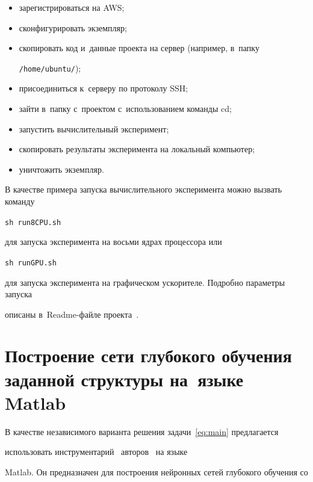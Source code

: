 \begin{itemize}


\item зарегистрироваться на AWS;


\item сконфигурировать экземпляр;


\item скопировать код и~данные проекта на сервер (например, в~папку 


\texttt{/home/ubuntu/});


\item присоединиться к~серверу по протоколу SSH;


\item зайти в~папку с~проектом с~использованием команды cd;


\item запустить вычислительный эксперимент;


\item скопировать результаты эксперимента на локальный компьютер;


\item уничтожить экземпляр.


\end{itemize}


В качестве примера запуска вычислительного эксперимента можно вызвать команду


\texttt{sh run8CPU.sh}


для запуска эксперимента на восьми ядрах процессора или


\texttt{sh runGPU.sh}


для запуска эксперимента на графическом ускорителе. Подробно параметры запуска 


описаны в~Readme-файле проекта~\cite{svn}.





\section{Построение сети глубокого обучения заданной структуры на~языке Matlab}





В качестве независимого варианта решения задачи~\eqref{eq:main} предлагается 


использовать инструментарий~\cite{source_popova} авторов~\cite{ts3} на языке 


Matlab. Он предназначен для построения нейронных сетей глубокого обучения со 



